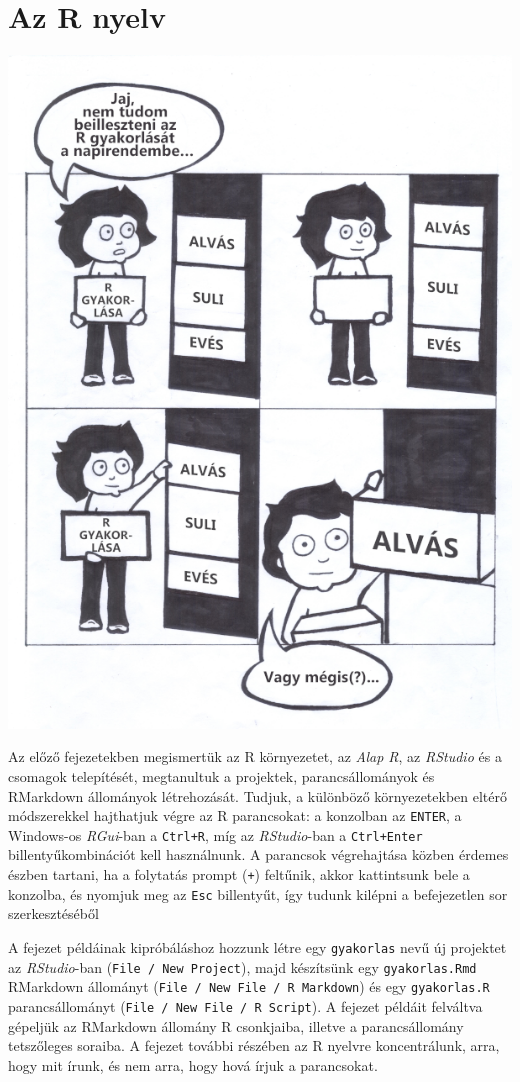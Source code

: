 \documentclass[
]{book}
\begin{document}
\hypertarget{az-r-nyelv}{%
\chapter{Az R nyelv}\label{az-r-nyelv}}

\begin{center}\includegraphics[width=0.7\linewidth]{images/ch_05_small} \end{center}

Az előző fejezetekben megismertük az R környezetet, az \emph{Alap R}, az \emph{RStudio} és a csomagok telepítését, megtanultuk a projektek, parancsállományok és RMarkdown állományok létrehozását. Tudjuk, a különböző környezetekben eltérő módszerekkel hajthatjuk végre az R parancsokat: a konzolban az \texttt{ENTER}, a Windows-os \emph{RGui}-ban a \texttt{Ctrl+R}, míg az \emph{RStudio}-ban a \texttt{Ctrl+Enter} billentyűkombinációt kell használnunk. A parancsok végrehajtása közben érdemes észben tartani, ha a folytatás prompt (\texttt{+}) feltűnik, akkor kattintsunk bele a konzolba, és nyomjuk meg az \texttt{Esc} billentyűt, így tudunk kilépni a befejezetlen sor szerkesztéséből

A fejezet példáinak kipróbáláshoz hozzunk létre egy \texttt{gyakorlas} nevű új projektet az \emph{RStudio}-ban (\texttt{File\ /\ New\ Project}), majd készítsünk egy \texttt{gyakorlas.Rmd} RMarkdown állományt (\texttt{File\ /\ New\ File\ /\ R\ Markdown}) és egy \texttt{gyakorlas.R} parancsállományt (\texttt{File\ /\ New\ File\ /\ R\ Script}). A fejezet példáit felváltva gépeljük az RMarkdown állomány R csonkjaiba, illetve a parancsállomány tetszőleges soraiba. A fejezet további részében az R nyelvre koncentrálunk, arra, hogy mit írunk, és nem arra, hogy hová írjuk a parancsokat.
\end{document}
